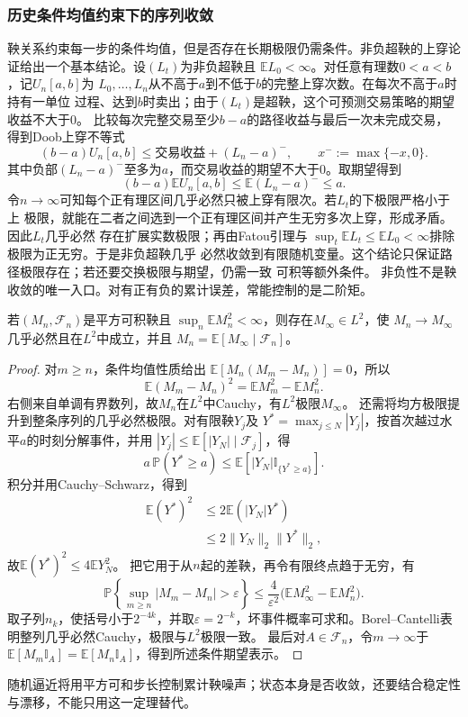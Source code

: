 \subsubsection{历史条件均值约束下的序列收敛}
鞅关系约束每一步的条件均值，但是否存在长期极限仍需条件。非负超鞅的上穿论证给出一个基本结论。设$(L_t)$为非负超鞅且
$\mathbb{E}L_0<\infty$。对任意有理数$0<a<b$，记$U_n[a,b]$为
$L_0,\ldots,L_n$从不高于$a$到不低于$b$的完整上穿次数。在每次不高于$a$时持有一单位
过程、达到$b$时卖出；由于$(L_t)$是超鞅，这个可预测交易策略的期望收益不大于$0$。
比较每次完整交易至少$b-a$的路径收益与最后一次未完成交易，得到Doob上穿不等式
\[
  (b-a)U_n[a,b]
  \leq
  \text{交易收益}+(L_n-a)^-,
  \qquad x^-:=\max\{-x,0\}.
\]
其中负部$(L_n-a)^-$至多为$a$，而交易收益的期望不大于$0$。取期望得到
\[
  (b-a)\mathbb{E}U_n[a,b]
  \leq
  \mathbb{E}(L_n-a)^-
  \leq
  a.
\]
令$n\to\infty$可知每个正有理区间几乎必然只被上穿有限次。若$L_t$的下极限严格小于上
极限，就能在二者之间选到一个正有理区间并产生无穷多次上穿，形成矛盾。因此$L_t$几乎必然
存在扩展实数极限；再由Fatou引理与
$\sup_t\mathbb{E}L_t\leq\mathbb{E}L_0<\infty$排除极限为正无穷。于是非负超鞅几乎
必然收敛到有限随机变量。这个结论只保证路径极限存在；若还要交换极限与期望，仍需一致
可积等额外条件。
非负性不是鞅收敛的唯一入口。对有正有负的累计误差，常能控制的是二阶矩。
\begin{theorem}[二阶矩有界鞅的收敛]
\label{thm:rv-l2-martingale-convergence}
若\((M_n,\mathcal F_n)\)是平方可积鞅且
\(\sup_n\mathbb E M_n^2<\infty\)，则存在\(M_\infty\in L^2\)，使
\(M_n\to M_\infty\)几乎必然且在\(L^2\)中成立，并且
\(M_n=\mathbb E[M_\infty\mid\mathcal F_n]\)。
\end{theorem}
\begin{proof}
对\(m\geq n\)，条件均值性质给出
\(\mathbb E[M_n(M_m-M_n)]=0\)，所以
\[
\mathbb E(M_m-M_n)^2=\mathbb EM_m^2-\mathbb EM_n^2.
\]
右侧来自单调有界数列，故\(M_n\)在\(L^2\)中Cauchy，有\(L^2\)极限\(M_\infty\)。
还需将均方极限提升到整条序列的几乎必然极限。对有限鞅\(Y_j\)及
\(Y^*=\max_{j\leq N}|Y_j|\)，按首次越过水平\(a\)的时刻分解事件，并用
\(|Y_j|\leq\mathbb E[|Y_N|\mid\mathcal F_j]\)，得
\[
a\,\mathbb P(Y^*\geq a)
\leq\mathbb E[|Y_N|\mathbb I_{\{Y^*\geq a\}}].
\]
积分并用Cauchy--Schwarz，得到
\[
\begin{aligned}
 \mathbb E(Y^*)^2
 &\leq2\mathbb E(|Y_N|Y^*)\\
 &\leq2\|Y_N\|_2\|Y^*\|_2,
\end{aligned}
\]
故\(\mathbb E(Y^*)^2\leq4\mathbb E Y_N^2\)。
把它用于从\(n\)起的差鞅，再令有限终点趋于无穷，有
\[
\mathbb P\left\{\sup_{m\geq n}|M_m-M_n|>\varepsilon\right\}
\leq\frac4{\varepsilon^2}
\bigl(\mathbb EM_\infty^2-\mathbb EM_n^2\bigr).
\]
取子列\(n_k\)，使括号小于\(2^{-4k}\)，并取\(\varepsilon=2^{-k}\)，坏事件概率可求和。Borel--Cantelli表明整列几乎必然Cauchy，极限与\(L^2\)极限一致。
最后对\(A\in\mathcal F_n\)，令\(m\to\infty\)于
\(\mathbb E[M_m\mathbb I_A]=\mathbb E[M_n\mathbb I_A]\)，得到所述条件期望表示。
\end{proof}
随机逼近将用平方可和步长控制累计鞅噪声；状态本身是否收敛，还要结合稳定性与漂移，不能只用这一定理替代。

